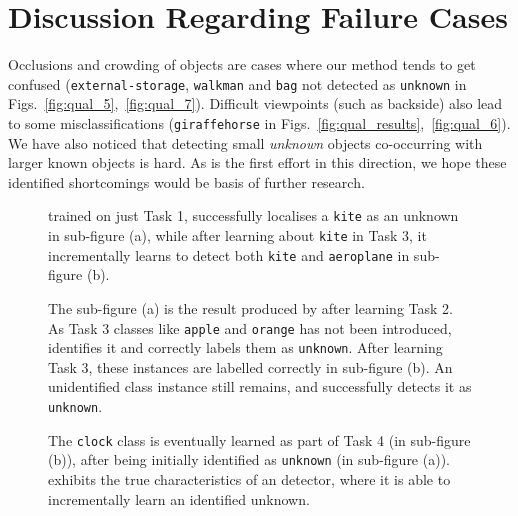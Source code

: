 \documentclass[final]{cvpr}
\newcommand{\cls}[1]{{\small\texttt{#1}}}
\begin{document}
\section{Discussion Regarding Failure Cases}
Occlusions and crowding of objects are cases where our method tends to get confused (\cls{external-storage}, \cls{walkman} and \cls{bag} not detected as \cls{unknown} in Figs.~\ref{fig:qual_5},~\ref{fig:qual_7}). Difficult viewpoints (such as backside) also lead to some misclassifications (\cls{giraffe}\cls{horse} in Figs.~\ref{fig:qual_results},~\ref{fig:qual_6}).
We have also noticed that detecting small \emph{unknown} objects co-occurring with larger known objects is hard. 
As \method is the first effort in this direction, we hope these identified shortcomings would be basis of further research. 

\begin{figure}[h]
\vspace{20pt}
\centering
{}
\hspace{3pt}
\caption{\method trained on just Task 1, successfully localises a \cls{kite} as an unknown in sub-figure (a), while after learning about \cls{kite} in Task 3, it incrementally learns to detect both \cls{kite} and \cls{aeroplane} in sub-figure (b).}
\label{fig:qual_4}
\end{figure}


\begin{figure*}[h]
\vspace{-30pt}
\centering
{}
\hspace{3pt}
\vspace{-10pt}
\caption{The sub-figure (a) is the result produced by \method after learning Task 2. As Task 3 classes like \cls{apple} and \cls{orange} has not been introduced, \method identifies it and correctly labels them as \cls{unknown}. After learning Task 3, these instances are labelled correctly in sub-figure (b). An unidentified class instance still remains, and \method successfully detects it as \cls{unknown}.}
\label{fig:qual_1}
\end{figure*}


\begin{figure*}[h]
\vspace{-15pt}
\centering
{}
\hspace{3pt}
\vspace{-10pt}
\caption{The \cls{clock} class is eventually learned as part of Task 4 (in sub-figure (b)), after being initially identified as \cls{unknown} (in sub-figure (a)). \method  exhibits the true characteristics of an \OW detector, where it is able to incrementally learn an identified unknown.}
\label{fig:qual_3}
\end{figure*}
\end{document}
